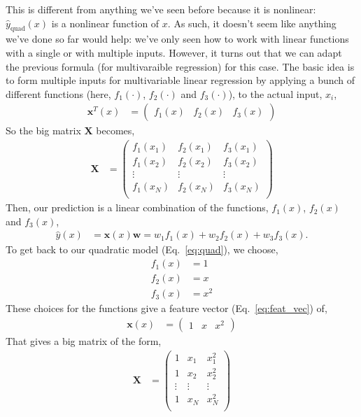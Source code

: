 \documentclass{article}
\newcommand{\yh}{\hat{y}}
\newcommand{\x}{\mathbf{x}}
\newcommand{\X}{\mathbf{X}}
\newcommand{\w}{\mathbf{w}}
\begin{document}
This is different from anything we've seen before because it is nonlinear: $\yh_\text{quad}(x)$ is a nonlinear function of $x$.
As such, it doesn't seem like anything we've done so far would help: we've only seen how to work with linear functions with a single or with multiple inputs.
However, it turns out that we can adapt the previous formula (for multivaraible regression) for this case.
The basic idea is to form multiple inputs for multivariable linear regression by applying a bunch of different functions (here, $f_1(\cdot)$, $f_2(\cdot)$ and $f_3(\cdot)$), to the actual input, $x_i$,
\begin{align}
  \label{eq:feat_vec}
  \x^T(x) &= \begin{pmatrix} f_1(x) & f_2(x) & f_3(x) \end{pmatrix}
\end{align}
So the big matrix $\X$ becomes,
\begin{align}
  \X &= \begin{pmatrix}
    f_1(x_1) & f_2(x_1) & f_3(x_1)\\
    f_1(x_2) & f_2(x_2) & f_3(x_2)\\
    \vdots & \vdots & \vdots\\
    f_1(x_N) & f_2(x_N) & f_3(x_N)\\
  \end{pmatrix}
\end{align}
Then, our prediction is a linear combination of the functions, $f_1(x)$, $f_2(x)$ and $f_3(x)$,
\begin{align}
  \label{eq:nonlin_yh}
  \yh(x) &= \x(x) \w = w_1 f_1(x) + w_2 f_2(x) + w_3 f_3(x).
\end{align}
To get back to our quadratic model (Eq.~\ref{eq:quad}), we choose,
\begin{align}
  f_1(x) &= 1\\
  f_2(x) &= x\\
  f_3(x) &= x^2
\end{align}
These choices for the functions give a feature vector (Eq.~\ref{eq:feat_vec}) of,
\begin{align}
  \x(x) &= \begin{pmatrix} 1 & x & x^2 \end{pmatrix}
\end{align}
That gives a big matrix of the form,
\begin{align}
  \X &= \begin{pmatrix}
    1 & x_1 & x_1^2\\
    1 & x_2 & x_2^2\\
    \vdots & \vdots & \vdots\\
    1 & x_N & x_N^2\\
  \end{pmatrix}
\end{align}
\end{document}
